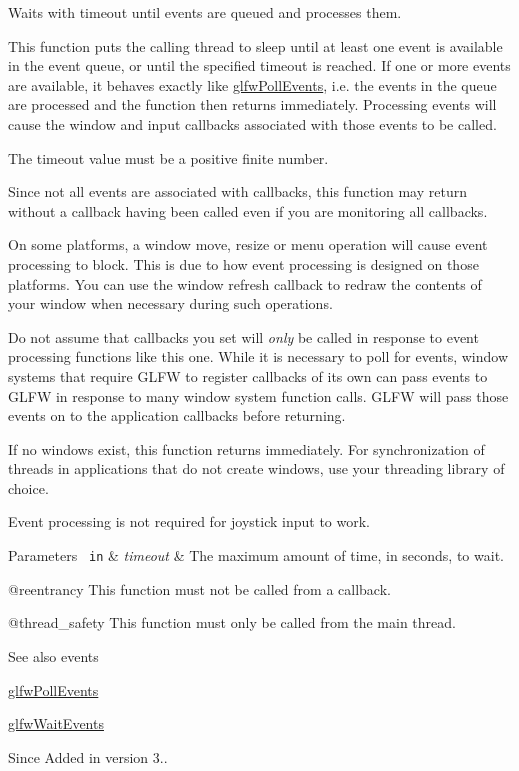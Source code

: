 Waits with timeout until events are queued and processes them. 

This function puts the calling thread to sleep until at least one event is available in the event queue, or until the specified timeout is reached. If one or more events are available, it behaves exactly like \mbox{\hyperlink{group__window_ga872d16e4c77f58c0436f356255920cfc}{glfw\+Poll\+Events}}, i.\+e. the events in the queue are processed and the function then returns immediately. Processing events will cause the window and input callbacks associated with those events to be called.

The timeout value must be a positive finite number.

Since not all events are associated with callbacks, this function may return without a callback having been called even if you are monitoring all callbacks.

On some platforms, a window move, resize or menu operation will cause event processing to block. This is due to how event processing is designed on those platforms. You can use the window refresh callback to redraw the contents of your window when necessary during such operations.

Do not assume that callbacks you set will {\itshape only} be called in response to event processing functions like this one. While it is necessary to poll for events, window systems that require G\+L\+FW to register callbacks of its own can pass events to G\+L\+FW in response to many window system function calls. G\+L\+FW will pass those events on to the application callbacks before returning.

If no windows exist, this function returns immediately. For synchronization of threads in applications that do not create windows, use your threading library of choice.

Event processing is not required for joystick input to work.


\begin{DoxyParams}[1]{Parameters}
\mbox{\texttt{ in}}  & {\em timeout} & The maximum amount of time, in seconds, to wait.\\
\hline
\end{DoxyParams}
@reentrancy This function must not be called from a callback.

@thread\+\_\+safety This function must only be called from the main thread.

\begin{DoxySeeAlso}{See also}
events 

\mbox{\hyperlink{group__window_ga872d16e4c77f58c0436f356255920cfc}{glfw\+Poll\+Events}} 

\mbox{\hyperlink{group__window_ga6e042d05823c11e11c7339b81a237738}{glfw\+Wait\+Events}}
\end{DoxySeeAlso}
\begin{DoxySince}{Since}
Added in version 3.. 
\end{DoxySince}
\mbox{\label{group__window_ga69c40728499720bef8a49aa925ea0efa}} 
